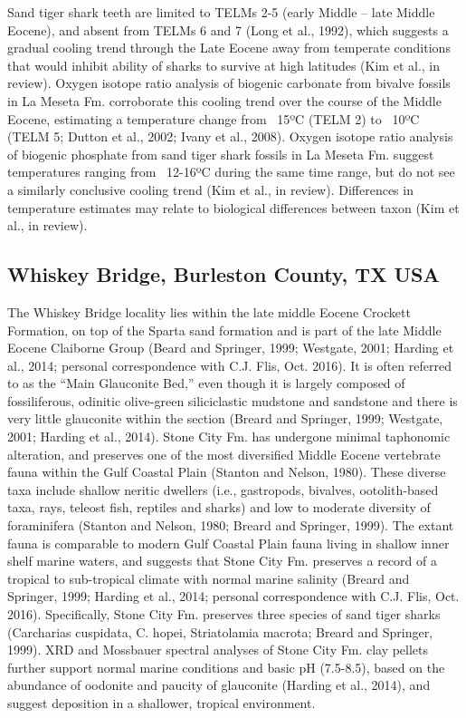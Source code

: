 \documentclass[]{rsos}%
\begin{document}
Sand tiger shark teeth are limited to TELMs 2-5 (early Middle – late Middle Eocene), and absent from TELMs 6 and 7 (Long et al., 1992), which suggests a gradual cooling trend through the Late Eocene away from temperate conditions that would inhibit ability of sharks to survive at high latitudes (Kim et al., in review).
Oxygen isotope ratio analysis of biogenic carbonate from bivalve fossils in La Meseta Fm. corroborate this cooling trend over the course of the Middle Eocene, estimating a temperature change from ~15ºC (TELM 2) to ~10ºC (TELM 5; Dutton et al., 2002; Ivany et al., 2008). 
Oxygen isotope ratio analysis of biogenic phosphate from sand tiger shark fossils in La Meseta Fm. suggest temperatures ranging from ~12-16ºC during the same time range, but do not see a similarly conclusive cooling trend (Kim et al., in review).
Differences in temperature estimates may relate to biological differences between taxon (Kim et al., in review).

\subsection{Whiskey Bridge, Burleston County, TX USA}

The Whiskey Bridge locality lies within the late middle Eocene Crockett Formation, on top of the Sparta sand formation and is part of the late Middle Eocene Claiborne Group (Beard and Springer, 1999; Westgate, 2001; Harding et al., 2014; personal correspondence with C.J. Flis, Oct. 2016). 
It is often referred to as the “Main Glauconite Bed,” even though it is largely composed of fossiliferous, odinitic olive-green siliciclastic mudstone and sandstone and there is very little glauconite within the section (Breard and Springer, 1999; Westgate, 2001; Harding et al., 2014). 
Stone City Fm. has undergone minimal taphonomic alteration, and preserves one of the most diversified Middle Eocene vertebrate fauna within the Gulf Coastal Plain (Stanton and Nelson, 1980).
These diverse taxa include shallow neritic dwellers (i.e., gastropods, bivalves, ootolith-based taxa, rays, teleost fish, reptiles and sharks) and low to moderate diversity of foraminifera (Stanton and Nelson, 1980; Breard and Springer, 1999). 
The extant fauna is comparable to modern Gulf Coastal Plain fauna living in shallow inner shelf marine waters, and suggests that Stone City Fm. preserves a record of a tropical to sub-tropical climate with normal marine salinity (Breard and Springer, 1999; Harding et al., 2014; personal correspondence with C.J. Flis, Oct. 2016). 
Specifically, Stone City Fm. preserves three species of sand tiger sharks (Carcharias cuspidata, C. hopei, Striatolamia macrota; Breard and Springer, 1999). 
XRD and Mossbauer spectral analyses of Stone City Fm. clay pellets further support normal marine conditions and basic pH (7.5-8.5), based on the abundance of oodonite and paucity of glauconite (Harding et al., 2014), and suggest deposition in a shallower, tropical environment.
\end{document}
